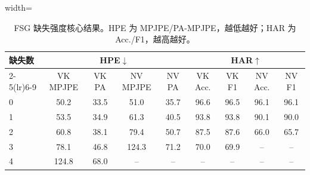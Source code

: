 \begin{table}[t]
\centering
\caption{FSG 缺失强度核心结果。HPE 为 MPJPE/PA-MPJPE，越低越好；HAR 为 Acc./F1，越高越好。}
\label{tab:severity_cn}
\scriptsize
\begin{adjustbox}{width=\textwidth}
\begin{tabular}{lcccccccc}
\toprule
\multirow{2}{*}{缺失数} & \multicolumn{4}{c}{HPE$\downarrow$} & \multicolumn{4}{c}{HAR$\uparrow$} \\
\cmidrule(lr){2-5}\cmidrule(lr){6-9}
 & VK MPJPE & VK PA & NV MPJPE & NV PA & VK Acc. & VK F1 & NV Acc. & NV F1 \\
\midrule
0 & 50.2 & 33.5 & 51.0 & 35.7 & 96.6 & 96.5 & 96.1 & 96.1 \\
1 & 53.5 & 34.9 & 61.3 & 40.5 & 93.8 & 93.8 & 90.1 & 90.0 \\
2 & 60.8 & 38.1 & 79.4 & 50.7 & 87.5 & 87.6 & 66.0 & 65.7 \\
3 & 78.1 & 46.8 & 124.3 & 71.2 & 70.0 & 69.9 & -- & -- \\
4 & 124.8 & 68.0 & -- & -- & -- & -- & -- & -- \\
\bottomrule
\end{tabular}
\end{adjustbox}
\end{table}
